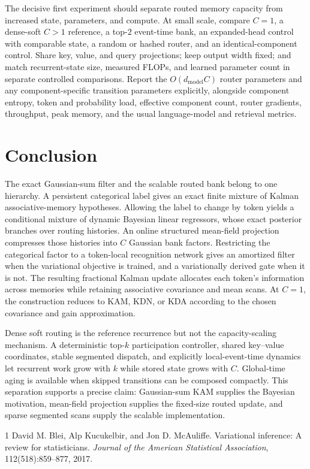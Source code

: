 \documentclass[11pt]{article}
\begin{document}
The decisive first experiment should separate routed memory capacity from increased state,
parameters, and compute.  At small scale, compare $C=1$, a dense-soft $C>1$ reference, a top-$2$
event-time bank, an expanded-head control with comparable state, a random or hashed router, and an
identical-component control.  Share key, value, and query projections; keep output width fixed;
and match recurrent-state size, measured FLOPs, and learned parameter count in separate controlled
comparisons.  Report the $O(d_{\mathrm{model}}C)$ router parameters and any component-specific
transition parameters explicitly, alongside component entropy, token and probability load,
effective component count, router gradients, throughput, peak memory, and the usual
language-model and retrieval metrics.

\section{Conclusion}

The exact Gaussian-sum filter and the scalable routed bank belong to one hierarchy.  A persistent
categorical label gives an exact finite mixture of Kalman associative-memory hypotheses.  Allowing
the label to change by token yields a conditional mixture of dynamic Bayesian linear regressors,
whose exact posterior branches over routing histories.  An online structured mean-field
projection compresses those histories into $C$ Gaussian bank factors.  Restricting the categorical
factor to a token-local recognition network gives an amortized filter when the variational
objective is trained, and a variationally derived gate when it is not.  The resulting fractional
Kalman update allocates each token's information across memories while retaining associative
covariance and mean scans.  At $C=1$, the construction reduces to KAM, KDN, or KDA according to the
chosen covariance and gain approximation.

Dense soft routing is the reference recurrence but not the capacity-scaling mechanism.  A
deterministic top-$k$ participation controller, shared key--value coordinates, stable segmented
dispatch, and explicitly local-event-time dynamics let recurrent work grow with $k$ while stored
state grows with $C$.  Global-time aging is available when skipped transitions can be composed
compactly.  This separation supports a precise claim: Gaussian-sum KAM supplies the Bayesian
motivation, mean-field projection supplies the fixed-size routed update, and sparse segmented
scans supply the scalable implementation.

\begin{thebibliography}{1}
David M. Blei, Alp Kucukelbir, and Jon D. McAuliffe.
\newblock Variational inference: A review for statisticians.
\newblock \emph{Journal of the American Statistical Association}, 112(518):859--877, 2017.
\end{thebibliography}
\end{document}
